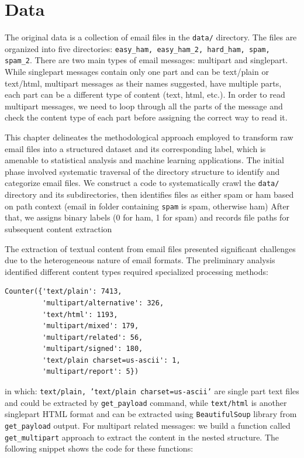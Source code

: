 \chapter{Data}

The original data is a collection of email files in the \texttt{data/} directory. The files are organized into five directories: \texttt{easy\_ham, easy\_ham\_2, hard\_ham, spam, spam\_2}.
There are two main types of email messages: multipart and singlepart.
While singlepart messages contain only one part and can be text/plain or text/html,
multipart messages as their names suggested, have multiple parts, each part can be a different type of content (text, html, etc.).
In order to read multipart messages, we need to loop through all the parts of the message and check the content type of each part before assigning the correct way to read it.

This chapter delineates the methodological approach employed to transform raw email files into a structured dataset and its corresponding label, which is amenable to statistical analysis and machine learning applications. 
The initial phase involved systematic traversal of the directory structure to identify and categorize email files. 
We construct a code to systematically crawl the \texttt{data/} directory and its subdirectories, then identifies files as either spam or ham based on path context (email in folder containing \texttt{spam} is spam, otherwise ham)
After that, we assigns binary labels (0 for ham, 1 for spam) and records file paths for subsequent content extraction

The extraction of textual content from email files presented significant challenges due to the heterogeneous nature of email formats.
The preliminary analysis identified different content types required specialized processing methods:

\begin{verbatim}
Counter({'text/plain': 7413,
         'multipart/alternative': 326,
         'text/html': 1193,
         'multipart/mixed': 179,
         'multipart/related': 56,
         'multipart/signed': 180,
         'text/plain charset=us-ascii': 1,
         'multipart/report': 5})
\end{verbatim}

in which: \texttt{text/plain, 'text/plain charset=us-ascii'} are single part text files and could be extracted by \texttt{get\_payload} command, while \texttt{text/html} is another singlepart HTML format and can be extracted using \texttt{BeautifulSoup} library from \texttt{get\_payload} output.
For multipart related messages: we build a function called \texttt{get\_multipart} approach to extract the content in the nested structure. The following snippet shows the code for these functions:

